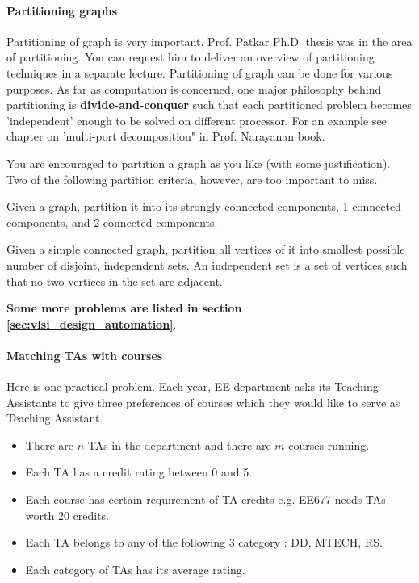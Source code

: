 \paragraph{Partitioning graphs} 

  Partitioning of graph is very important. Prof.  Patkar Ph.D. thesis was in
  the area of partitioning. You can request him to deliver an overview of
  partitioning techniques in a separate lecture.  Partitioning of graph can be
  done for various purposes. As far as computation is concerned, one major
  philosophy behind partitioning is \textbf{divide-and-conquer} such that each
  partitioned problem becomes 'independent' enough to be solved on different
  processor. For an example see chapter on 'multi-port decomposition" in Prof.
  Narayanan book.

  You are encouraged to partition a graph as you like (with some justification).
  Two of the following partition criteria, however, are too important to miss. 

  \begin{problem}[15]
  Given a graph, partition it into its strongly connected components,
  1-connected components, and 2-connected components.
  \end{problem}

  \begin{problem}[25]
  Given a simple connected graph, partition all vertices of it into smallest
  possible number of disjoint, independent sets. An independent set is a set
  of vertices such that no two vertices in the set are adjacent.
  \end{problem}

  \textbf{Some more problems are listed in section
  \ref{sec:vlsi_design_automation}}.

\paragraph{Matching TAs with courses}

  Here is one practical problem. Each year, EE department asks its Teaching
  Assistants to give three preferences of courses which they would like to serve
  as Teaching Assistant.

  \begin{itemize}
    \item There are $n$ TAs in the department and there are $m$ courses running.
    \item Each TA has a credit rating between 0 and 5.
    \item Each course has certain requirement of TA credits e.g. EE677 needs
    TAs worth 20 credits.
    \item Each TA belongs to any of the following 3 category : DD, MTECH, RS.
    \item Each category of TAs has its average rating.
  \end{itemize}

